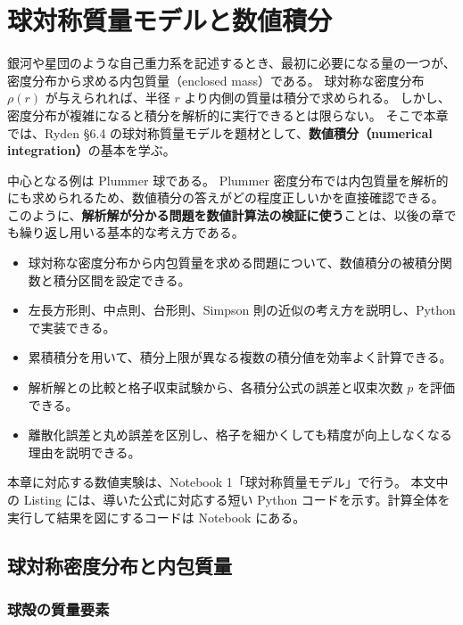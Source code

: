 \chapter{球対称質量モデルと数値積分}
\label{chap:numint}

銀河や星団のような自己重力系を記述するとき、最初に必要になる量の一つが、密度分布から求める内包質量（enclosed mass）である。
球対称な密度分布 $\rho(r)$ が与えられれば、半径 $r$ より内側の質量は積分で求められる。
しかし、密度分布が複雑になると積分を解析的に実行できるとは限らない。
そこで本章では、Ryden §6.4 の球対称質量モデルを題材として、\textbf{数値積分（numerical integration）}の基本を学ぶ\cite{ryden2025}。

中心となる例は Plummer 球である。
Plummer 密度分布では内包質量を解析的にも求められるため、数値積分の答えがどの程度正しいかを直接確認できる。
このように、\textbf{解析解が分かる問題を数値計算法の検証に使う}ことは、以後の章でも繰り返し用いる基本的な考え方である。

\begin{learningbox}[本章で学ぶこと]
\begin{itemize}
\item 球対称な密度分布から内包質量を求める問題について、数値積分の被積分関数と積分区間を設定できる。
\item 左長方形則、中点則、台形則、Simpson 則の近似の考え方を説明し、Python で実装できる。
\item 累積積分を用いて、積分上限が異なる複数の積分値を効率よく計算できる。
\item 解析解との比較と格子収束試験から、各積分公式の誤差と収束次数 $p$ を評価できる。
\item 離散化誤差と丸め誤差を区別し、格子を細かくしても精度が向上しなくなる理由を説明できる。
\end{itemize}
\end{learningbox}

本章に対応する数値実験は、Notebook 1「球対称質量モデル」で行う。
本文中の Listing には、導いた公式に対応する短い Python コードを示す。計算全体を実行して結果を図にするコードは Notebook にある。

\section{球対称密度分布と内包質量}
\label{sec:ch1-spherical-mass}

\subsection{球殻の質量要素}

